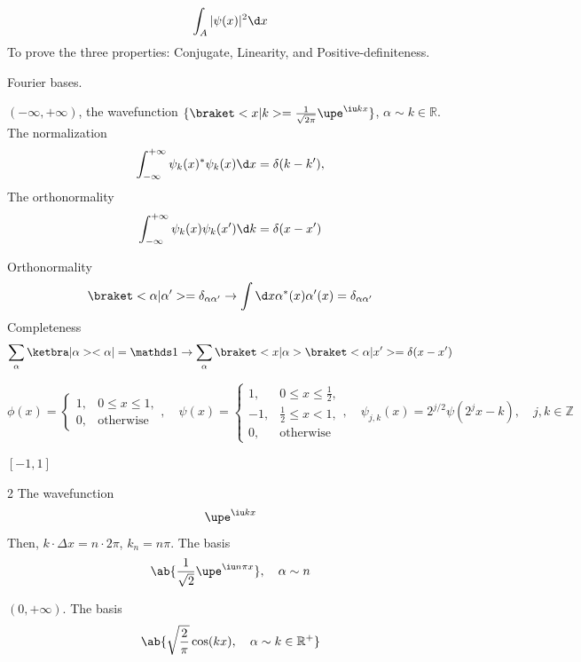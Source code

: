\setcounter{problem}{0}
\begin{problem}
\end{problem}
\begin{solution}[By TA]\leavevmode
  \begin{enumext}
    \item \[
      \int_A |\psi(x)|^2 \d x
    \]
    To prove the three properties: Conjugate, Linearity,
    and Positive-definiteness.
    \item Fourier bases.
    \begin{enumext}
      \item $(-\infty, +\infty)$, the wavefunction
      $\{\braket<x|k> = \frac1{\sqrt{2\pi}}\upe^{\iu kx}\}$,
      $\alpha \sim k \in \mathbb R$.
      The normalization
      \[
        \int_{-\infty}^{+\infty} \psi_k(x)^* \psi_k(x) \d x = \delta(k - k'),
      \]
      The orthonormality
      \[
        \int_{-\infty}^{+\infty} \psi_k(x) \psi_k(x') \d k = \delta(x - x')
      \]
      \begin{remark}
        Orthonormality
        \[
          \braket<\alpha|\alpha'> = \delta_{\alpha\alpha'} \to
          \int \d x \alpha^*(x) \alpha'(x) = \delta_{\alpha\alpha'}
        \]
        Completeness
        \[
          \sum_\alpha \ketbra|\alpha><\alpha| = \identity \to
          \sum_\alpha \braket<x|\alpha>\braket<\alpha|x'> = \delta(x - x')
        \]
      \end{remark}
      \begin{remark}
      \[
        \phi(x) = \begin{cases}
          1, & 0 \leq x \leq 1,\\
          0, & \text{otherwise}
        \end{cases}, \quad
        \psi(x) = 
        \begin{cases}
          1, & 0 \leq x \leq \frac12,\\
          -1, & \frac12 \leq x < 1,\\
          0, & \text{otherwise}
        \end{cases}, \quad
        \psi_{j,k}(x) = 2^{j/2} \psi(2^jx - k), \quad j, k \in \mathbb Z
      \]
      \end{remark}
      \item $[-1, 1]$
      \begin{paracol}{2}
      The wavefunction
      \[
        \upe^{\iu k x}
      \]
      Then, $k \cdot \Delta x = n \cdot 2\pi$, $k_n = n\pi$. The basis
      \[
        \ab\{\frac1{\sqrt2} \upe^{\iu n\pi x}\}, \quad \alpha \sim n
      \]
      \switchcolumn \centering
      \end{paracol}
      \item $(0, +\infty)$. The basis
      \[
        \ab\{\sqrt{\frac2\pi} \cos(kx), \quad \alpha \sim k \in \mathbb R^+\}
      \]
    \end{enumext}
  \end{enumext}
\end{solution}
